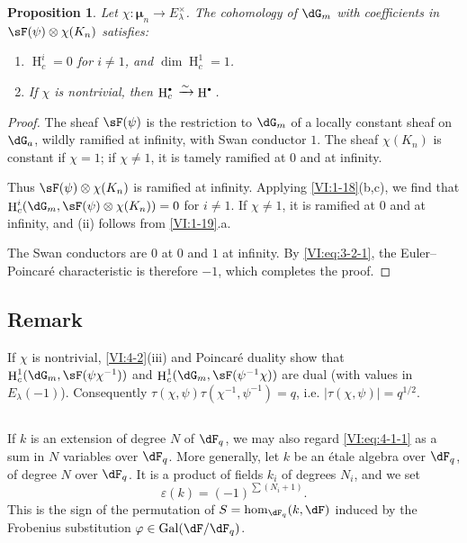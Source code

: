 \documentclass[12pt,oneside,english]{smfbook}
\DeclareMathOperator{\gal}{Gal}
\DeclareMathOperator{\h}{H}
\newcommand{\dmu}{{\bm\mu}}
\newcounter{char}
\newcommand{\iso}{\xrightarrow\sim}
\newtheorem{proposition_}[subsection]{Proposition}
\let\oldbullet\bullet
\renewcommand{\bullet}{\textnormal{\tiny$\oldbullet$}}
\begin{document}
\begin{proposition_}\label{VI:4-3}
Let $\chi:\dmu_n \to E_\lambda^\times$. The cohomology of $\dG_m$ with coefficients in $\sF(\psi)\otimes \chi(K_n)$ satisfies:
\begin{enumerate}[\indent (i)]
  \item $\h_c^i=0$ for $i\ne 1$, and $\dim \h_c^1{} = 1$.
  \item If $\chi$ is nontrivial, then $\h_c^\bullet{}\iso \h^\bullet{}$.
\end{enumerate}
\end{proposition_}
\begin{proof}
The sheaf $\sF(\psi)$ is the restriction to $\dG_m$ of a locally constant sheaf on $\dG_a$, wildly ramified at infinity, with Swan conductor $1$. The sheaf $\chi(K_n)$ is constant if $\chi=1$; if $\chi\ne1$, it is tamely ramified at $0$ and at infinity.

Thus $\sF(\psi)\otimes\chi(K_n)$ is ramified at infinity. Applying \ref{VI:1-18}(b,c), we find that $\h_c^i(\dG_m,\sF(\psi)\otimes\chi(K_n))=0$ for $i\ne1$. If $\chi\ne1$, it is ramified at $0$ and at infinity, and (ii) follows from \ref{VI:1-19}.a.

The Swan conductors are $0$ at $0$ and $1$ at infinity. By \eqref{VI:eq:3-2-1}, the Euler--Poincaré characteristic is therefore $-1$, which completes the proof.
\end{proof}

\subsection{Remark}\label{VI:4-4}

If $\chi$ is nontrivial, \ref{VI:4-2}(iii) and Poincaré duality show that $\h_c^1(\dG_m,\sF(\psi\chi^{-1}))$ and $\h_c^1(\dG_m,\sF(\psi^{-1}\chi))$ are dual (with values in $E_\lambda(-1)$). Consequently $\tau(\chi,\psi)\tau(\chi^{-1},\psi^{-1})=q$, i.e. $|\tau(\chi,\psi)|=q^{1/2}$.

\subsection{}\label{VI:4-5}

If $k$ is an extension of degree $N$ of $\dF_q$, we may also regard \eqref{VI:eq:4-1-1} as a sum in $N$ variables over $\dF_q$. More generally, let $k$ be an étale algebra over $\dF_q$, of degree $N$ over $\dF_q$. It is a product of fields $k_i$ of degrees $N_i$, and we set
\begin{equation*}\tag{4.5.1}\label{VI:eq:4-5-1}
  \varepsilon(k) = (-1)^{\sum (N_i+1)} \text{.}
\end{equation*}
This is the sign of the permutation of $S=\hom_{\dF_q}(k,\dF)$ induced by the Frobenius substitution $\varphi\in\gal(\dF/\dF_q)$.
\end{document}
